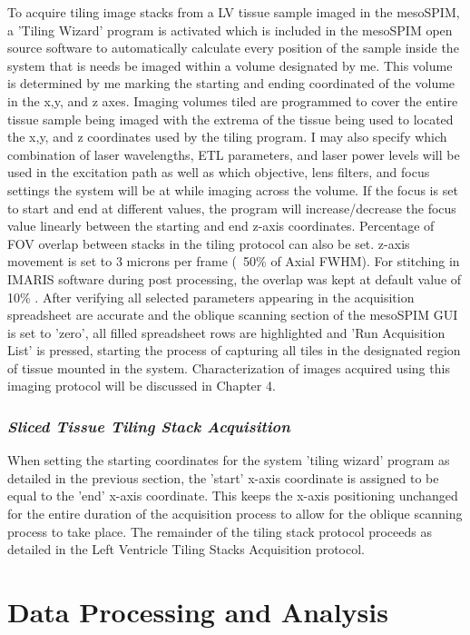 To acquire tiling image stacks from a LV tissue sample imaged in the mesoSPIM, a 'Tiling Wizard' program is activated which is included in the mesoSPIM open source software to automatically calculate every position of the sample inside the system that is needs be imaged within a volume designated by me. This volume is determined by me marking the starting and ending coordinated of the volume in the x,y, and z axes. Imaging volumes tiled are programmed to cover the entire tissue sample being imaged with the extrema of the tissue being used to located the x,y, and z coordinates used by the tiling program. I may also specify which combination of laser wavelengths, ETL parameters, and laser power levels will be used in the excitation path as well as which objective, lens filters, and focus settings the system will be at while imaging across the volume. If the focus is set to start and end at different values, the program will increase/decrease the focus value linearly between the starting and end z-axis coordinates. Percentage of FOV overlap between stacks in the tiling protocol can also be set. z-axis movement is set to 3 microns per frame (~50\% of Axial FWHM). For stitching in IMARIS software during post processing, the overlap was kept at default value of 10\% . After verifying all selected parameters appearing in the acquisition spreadsheet are accurate and the oblique scanning section of the mesoSPIM GUI is set to 'zero', all filled spreadsheet rows are highlighted and 'Run Acquisition List' is pressed, starting the process of capturing all tiles in the designated region of tissue mounted in the system. Characterization of images acquired using this imaging protocol will be discussed in Chapter 4.

\subsubsection{\textit{Sliced Tissue Tiling Stack Acquisition}}    

 When setting the starting coordinates for the system 'tiling wizard' program as detailed in the previous section, the 'start' x-axis coordinate is assigned to be equal to the 'end' x-axis coordinate. This keeps the x-axis positioning unchanged for the entire duration of the acquisition process to allow for the oblique scanning process to take place. The remainder of the tiling stack protocol proceeds as detailed in the Left Ventricle Tiling Stacks Acquisition protocol.

\section{Data Processing and Analysis}

